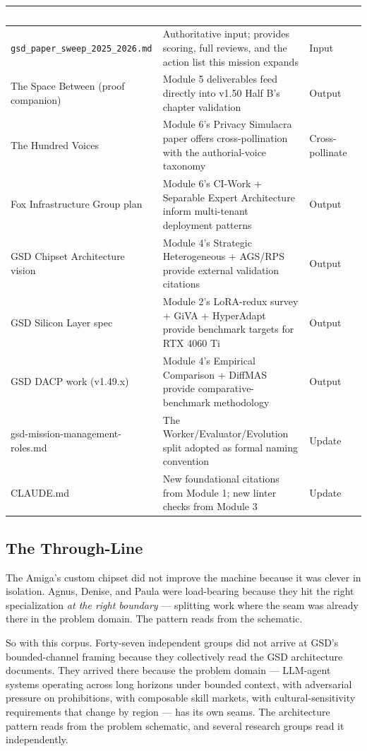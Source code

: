 \documentclass[11pt,letterpaper]{article}
\newcommand{\tableheader}[1]{\textbf{\sffamily\textcolor{white}{#1}}}
\begin{document}
\begin{center}
\begin{tabularx}{\textwidth}{L{4.5cm}XC{2.5cm}}
\toprule
{}
\tableheader{Document} & \tableheader{Relationship} & \tableheader{Direction} \\
\midrule
\texttt{gsd\_paper\_sweep\_2025\_2026.md} & Authoritative input; provides scoring, full reviews, and the action list this mission expands & Input \\
The Space Between (proof companion) & Module 5 deliverables feed directly into v1.50 Half B's chapter validation & Output \\
The Hundred Voices & Module 6's Privacy Simulacra paper offers cross-pollination with the authorial-voice taxonomy & Cross-pollinate \\
Fox Infrastructure Group plan & Module 6's CI-Work + Separable Expert Architecture inform multi-tenant deployment patterns & Output \\
GSD Chipset Architecture vision & Module 4's Strategic Heterogeneous + AGS/RPS provide external validation citations & Output \\
GSD Silicon Layer spec & Module 2's LoRA-redux survey + GiVA + HyperAdapt provide benchmark targets for RTX 4060 Ti & Output \\
GSD DACP work (v1.49.x) & Module 4's Empirical Comparison + DiffMAS provide comparative-benchmark methodology & Output \\
gsd-mission-management-roles.md & The Worker/Evaluator/Evolution split adopted as formal naming convention & Update \\
CLAUDE.md & New foundational citations from Module 1; new linter checks from Module 3 & Update \\
\bottomrule
\end{tabularx}
\end{center}

\subsection{The Through-Line}

The Amiga's custom chipset did not improve the machine because it was clever in isolation. Agnus, Denise, and Paula were load-bearing because they hit the right specialization \textit{at the right boundary} --- splitting work where the seam was already there in the problem domain. The pattern reads from the schematic.

So with this corpus. Forty-seven independent groups did not arrive at GSD's bounded-channel framing because they collectively read the GSD architecture documents. They arrived there because the problem domain --- LLM-agent systems operating across long horizons under bounded context, with adversarial pressure on prohibitions, with composable skill markets, with cultural-sensitivity requirements that change by region --- has its own seams. The architecture pattern reads from the problem schematic, and several research groups read it independently.
\end{document}

